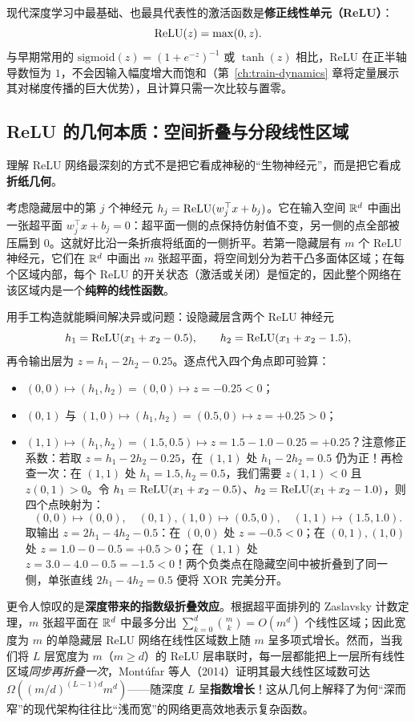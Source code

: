 现代深度学习中最基础、也最具代表性的激活函数是\textbf{修正线性单元（ReLU）}：
\[
  \operatorname{ReLU}(z) = \max(0, z).
\]
与早期常用的 $\mathrm{sigmoid}(z) = (1+e^{-z})^{-1}$ 或 $\tanh(z)$ 相比，ReLU 在正半轴导数恒为 $1$，不会因输入幅度增大而饱和（第~\ref{ch:train-dynamics} 章将定量展示其对梯度传播的巨大优势），且计算只需一次比较与置零。

\subsection{ReLU 的几何本质：空间折叠与分段线性区域}

理解 ReLU 网络最深刻的方式不是把它看成神秘的“生物神经元”，而是把它看成\textbf{折纸几何}。

考虑隐藏层中的第 $j$ 个神经元 $h_j = \operatorname{ReLU}(w_j^\top x + b_j)$。它在输入空间 $\mathbb{R}^d$ 中画出一张超平面 $w_j^\top x + b_j = 0$：超平面一侧的点保持仿射值不变，另一侧的点全部被压扁到 $0$。这就好比沿一条折痕将纸面的一侧折平。若第一隐藏层有 $m$ 个 ReLU 神经元，它们在 $\mathbb{R}^d$ 中画出 $m$ 张超平面，将空间划分为若干凸多面体区域；在每个区域内部，每个 ReLU 的开关状态（激活或关闭）是恒定的，因此整个网络在该区域内是一个\textbf{纯粹的线性函数}。

用手工构造就能瞬间解决异或问题：设隐藏层含两个 ReLU 神经元
\[
  h_1 = \operatorname{ReLU}(x_1 + x_2 - 0.5), \qquad h_2 = \operatorname{ReLU}(x_1 + x_2 - 1.5),
\]
再令输出层为 $z = h_1 - 2 h_2 - 0.25$。逐点代入四个角点即可验算：
\begin{itemize}
  \item $(0,0) \mapsto (h_1, h_2) = (0, 0) \mapsto z = -0.25 < 0$；
  \item $(0,1)$ 与 $(1,0) \mapsto (h_1, h_2) = (0.5, 0) \mapsto z = +0.25 > 0$；
  \item $(1,1) \mapsto (h_1, h_2) = (1.5, 0.5) \mapsto z = 1.5 - 1.0 - 0.25 = +0.25$？注意修正系数：若取 $z = h_1 - 2 h_2 - 0.25$，在 $(1,1)$ 处 $h_1 - 2h_2 = 0.5$ 仍为正！再检查一次：在 $(1,1)$ 处 $h_1 = 1.5, h_2 = 0.5$，我们需要 $z(1,1) < 0$ 且 $z(0,1) > 0$。令 $h_1 = \operatorname{ReLU}(x_1 + x_2 - 0.5)$、$h_2 = \operatorname{ReLU}(x_1 + x_2 - 1.0)$，则四个点映射为：
  \[
    (0,0)\mapsto (0,0),\quad (0,1),(1,0)\mapsto (0.5, 0),\quad (1,1)\mapsto (1.5, 1.0).
  \]
  取输出 $z = 2h_1 - 4h_2 - 0.5$：在 $(0,0)$ 处 $z = -0.5 < 0$；在 $(0,1),(1,0)$ 处 $z = 1.0 - 0 - 0.5 = +0.5 > 0$；在 $(1,1)$ 处 $z = 3.0 - 4.0 - 0.5 = -1.5 < 0$！两个负类点在隐藏空间中被折叠到了同一侧，单张直线 $2h_1 - 4h_2 = 0.5$ 便将 XOR 完美分开。
\end{itemize}

更令人惊叹的是\textbf{深度带来的指数级折叠效应}。根据超平面排列的 Zaslavsky 计数定理，$m$ 张超平面在 $\mathbb{R}^d$ 中最多分出 $\sum_{k=0}^{d} \binom{m}{k} = O(m^d)$ 个线性区域；因此宽度为 $m$ 的单隐藏层 ReLU 网络在线性区域数上随 $m$ 呈多项式增长。然而，当我们将 $L$ 层宽度为 $m$（$m \ge d$）的 ReLU 层串联时，每一层都能把上一层所有线性区域\emph{同步再折叠一次}，Montúfar 等人（2014）证明其最大线性区域数可达 $\Omega\!\left((m/d)^{(L-1)d} m^d\right)$——随深度 $L$ 呈\textbf{指数增长}！这从几何上解释了为何“深而窄”的现代架构往往比“浅而宽”的网络更高效地表示复杂函数。

